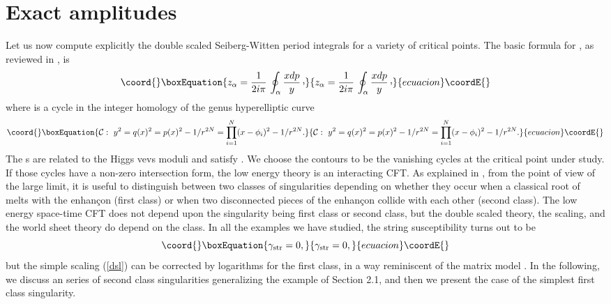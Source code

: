 \documentclass[a4paper,12pt]{article}
\def\cvp{\raise 2pt\hbox{,}}
\begin{document}
{\section{Exact amplitudes}
%
Let us now compute explicitly the double scaled Seiberg-Witten period 
integrals \coordHE{} for a variety of critical points. The basic formula for \coordHE{}, 
as reviewed in \cite{fer}, is \cite{SW,sun}
%
\begin{equation}\coord{}\boxEquation{
\label{zdef}
z_{\alpha} = {1\over 2i\pi}\, \oint_{\alpha} {x dp\over y}\, \cvp
}{
z_{\alpha} = {1\over 2i\pi}\, \oint_{\alpha} {x dp\over y}\, \cvp
}{ecuacion}\coordE{}\end{equation}
%
where \myHighlight{$\alpha$}\coordHE{} is a cycle in the integer homology of the genus \coordHE{}
hyperelliptic curve
%
\begin{equation}\coord{}\boxEquation{
\label{curve}
{\cal C}:\ y^{2} = q(x)^{2}= 
p(x)^{2} - 1/r^{2N} = \prod_{i=1}^{N}(x-\phi_{i})^{2} - 1/r^{2N}.
}{
{\cal C}:\ y^{2} = q(x)^{2}= 
p(x)^{2} - 1/r^{2N} = \prod_{i=1}^{N}(x-\phi_{i})^{2} - 1/r^{2N}.
}{ecuacion}\coordE{}\end{equation}
%
The \coordHE{}s are related to the Higgs vevs moduli and satisfy 
\coordHE{}. We choose the contours \myHighlight{$\alpha$}\coordHE{} to be the 
vanishing cycles at the critical point under study. If those cycles have 
a non-zero intersection form, the low energy theory is an interacting CFT.
As explained in \cite{fer}, 
from the point of view of the large \coordHE{} limit, it is useful to distinguish 
between two classes of singularities depending on whether they occur when a 
classical root of \coordHE{} melts with the enhan\c con (first class)
or when two disconnected pieces of the enhan\c con collide with each other 
(second class). The low energy space-time
CFT does not depend upon the singularity 
being first class or second class, but the double scaled theory, the 
scaling, and the world sheet theory
do depend on the class. In all the examples we have studied, the 
string susceptibility turns out to be
%
\begin{equation}\coord{}\boxEquation{
\label{gammastr}
\gamma_{\rm str} =0,
}{
\gamma_{\rm str} =0,
}{ecuacion}\coordE{}\end{equation}
%
but the simple scaling (\ref{dsl}) can be corrected by logarithms for the 
first class, in a way reminiscent of the \coordHE{} matrix model 
\cite{c1}. In the following, we discuss an \coordHE{} series of second 
class singularities generalizing the example \coordHE{} of Section 2.1,
and then we present the case of the simplest first class singularity.
%
}
\end{document}
